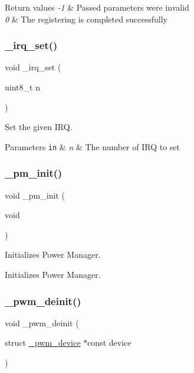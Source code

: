 \begin{DoxyRetVals}{Return values}
{\em -\/1} & Passed parameters were invalid \\
\hline
{\em 0} & The registering is completed successfully \\
\hline
\end{DoxyRetVals}
\mbox{\label{group___h_p_l_ga7720726f19dfdda1561a042483c97a58}} 
\subsubsection{\texorpdfstring{\+\_\+irq\+\_\+set()}{\_irq\_set()}}
{\footnotesize\ttfamily void \+\_\+irq\+\_\+set (\begin{DoxyParamCaption}\item[{uint8\+\_\+t}]{n }\end{DoxyParamCaption})}



Set the given I\+RQ. 


\begin{DoxyParams}[1]{Parameters}
\mbox{\tt in}  & {\em n} & The number of I\+RQ to set \\
\hline
\end{DoxyParams}
\mbox{\label{group___h_p_l_ga0e9b9fbf16506f0f6ad8e8b1aa87dc73}} 
\subsubsection{\texorpdfstring{\+\_\+pm\+\_\+init()}{\_pm\_init()}}
{\footnotesize\ttfamily void \+\_\+pm\+\_\+init (\begin{DoxyParamCaption}\item[{void}]{ }\end{DoxyParamCaption})}



Initializes Power Manager. 

Initializes Power Manager. \mbox{\label{group___h_p_l_ga0c2822fd73d42097e88ed03c54338f0f}} 
\subsubsection{\texorpdfstring{\+\_\+pwm\+\_\+deinit()}{\_pwm\_deinit()}}
{\footnotesize\ttfamily void \+\_\+pwm\+\_\+deinit (\begin{DoxyParamCaption}\item[{struct \hyperlink{struct__pwm__device}{\+\_\+pwm\+\_\+device} $\ast$const}]{device }\end{DoxyParamCaption})}



